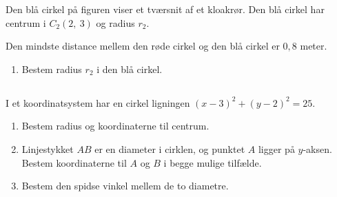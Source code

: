 \documentclass[10pt,a4paper,table]{article}
\begin{document}
Den blå cirkel på figuren viser et tværsnit af et kloakrør. Den blå cirkel har centrum i $C_2(2,\ 3)$ og radius $r_2$.

Den mindste distance mellem den røde cirkel og den blå cirkel er $0{,}8$ meter.

\begin{enumerate}[resume]
  \item Bestem radius $r_2$ i den blå cirkel.
\end{enumerate}


\subsection{}

I et koordinatsystem har en cirkel ligningen $(x-3)^2 + (y-2)^2 = 25$.

\begin{enumerate}
  \item Bestem radius og koordinaterne til centrum.
  \item Linjestykket $AB$ er en diameter i cirklen, og punktet $A$ ligger på $y$-aksen. Bestem koordinaterne til $A$ og $B$ i begge mulige tilfælde.
  \item Bestem den spidse vinkel mellem de to diametre.
\end{enumerate}
\end{document}
